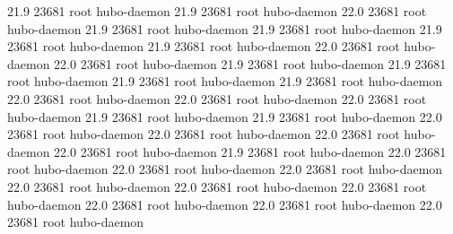 21.9 23681 root     hubo-daemon
21.9 23681 root     hubo-daemon
22.0 23681 root     hubo-daemon
21.9 23681 root     hubo-daemon
21.9 23681 root     hubo-daemon
21.9 23681 root     hubo-daemon
21.9 23681 root     hubo-daemon
22.0 23681 root     hubo-daemon
22.0 23681 root     hubo-daemon
21.9 23681 root     hubo-daemon
21.9 23681 root     hubo-daemon
21.9 23681 root     hubo-daemon
21.9 23681 root     hubo-daemon
22.0 23681 root     hubo-daemon
22.0 23681 root     hubo-daemon
22.0 23681 root     hubo-daemon
21.9 23681 root     hubo-daemon
21.9 23681 root     hubo-daemon
22.0 23681 root     hubo-daemon
22.0 23681 root     hubo-daemon
22.0 23681 root     hubo-daemon
22.0 23681 root     hubo-daemon
21.9 23681 root     hubo-daemon
22.0 23681 root     hubo-daemon
22.0 23681 root     hubo-daemon
22.0 23681 root     hubo-daemon
22.0 23681 root     hubo-daemon
22.0 23681 root     hubo-daemon
22.0 23681 root     hubo-daemon
22.0 23681 root     hubo-daemon
22.0 23681 root     hubo-daemon
22.0 23681 root     hubo-daemon
